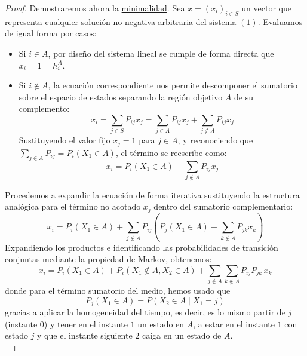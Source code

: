 \documentclass[10pt]{book}
\begin{document}
\begin{teo}
\begin{proof}
    \noindent
    Demostraremos ahora la \underline{minimalidad}. Sea $x = (x_i)_{i \in S}$ un vector que representa cualquier solución no negativa arbitraria del sistema $(1)$. Evaluamos de igual forma por casos:
    \begin{itemize}
        \item Si $i \in A$, por diseño del sistema lineal se cumple de forma directa que $x_i = 1 = h_i^A$.
        \item Si $i \notin A$, la ecuación correspondiente nos permite descomponer el sumatorio sobre el espacio de estados separando la región objetivo $A$ de su complemento:
        \[
        x_i = \sum_{j \in S} P_{ij} x_j = \sum_{j \in A} P_{ij} x_j + \sum_{j \notin A} P_{ij} x_j
        \]
        Sustituyendo el valor fijo $x_j = 1$ para $j \in A$, y reconociendo que $\sum\limits_{j \in A} P_{ij} = P_i(X_1 \in A)$, el término se reescribe como:
        \[
        x_i = P_i(X_1 \in A) + \sum_{j \notin A} P_{ij} x_j
        \]
    \end{itemize}
    Procedemos a expandir la ecuación de forma iterativa sustituyendo la estructura analógica para el término no acotado $x_j$ dentro del sumatorio complementario:
    \[
    x_i = P_i(X_1 \in A) + \sum_{j \notin A} P_{ij} \left( P_j(X_1 \in A) + \sum_{k \notin A} P_{jk} x_k \right)
    \]
    Expandiendo los productos e identificando las probabilidades de transición conjuntas mediante la propiedad de Markov, obtenemos:
    \[
    x_i = P_i(X_1 \in A) + P_i(X_1 \notin A, X_2 \in A) + \sum_{j \notin A} \sum_{k \notin A} P_{ij} P_{jk} \, x_k
    \]
    donde para el término sumatorio del medio, hemos usado que 
    $$ P_j(X_1 \in A) = P(X_2 \in A \mid X_1 = j) $$
    gracias a aplicar la homogeneidad del tiempo, es decir, es lo mismo partir de $j$ (instante $0$) y tener en el instante $1$ un estado en $A$, a estar en el instante $1$ con estado $j$ y que el instante siguiente $2$ caiga en un estado de $A$. \\


\end{proof}
\end{teo}
\end{document}
